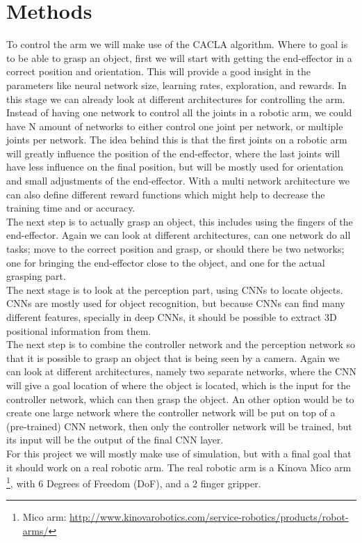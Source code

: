 \section{Methods}
To control the arm we will make use of the CACLA algorithm. Where to goal is to be able to grasp an object, first we will start with getting the end-effector in a correct position and orientation. This will provide a 
good insight in the parameters like neural network size, learning rates, exploration, and rewards. In this stage we can already look at different architectures for controlling the arm. Instead of having one network to
control all the joints in a robotic arm, we could have N amount of networks to either control one joint per network, or multiple joints per network. The idea behind this is that the first joints on a robotic arm will 
greatly influence the position of the end-effector, where the last joints will have less influence on the final position, but will be mostly used for orientation and small adjustments of the end-effector. With a multi network
architecture we can also define different reward functions which might help to decrease the training time and or accuracy. \\
The next step is to actually grasp an object, this includes using the fingers of the end-effector. Again we can look at different architectures, can one network do all tasks; move to the correct position and grasp, or should
there be two networks; one for bringing the end-effector close to the object, and one for the actual grasping part. \\
The next stage is to look at the perception part, using CNNs to locate objects. CNNs are mostly used for object recognition, but because CNNs can find many different features, specially in deep CNNs, it should be possible to 
extract 3D positional information from them. \\
The next step is to combine the controller network and the perception network so that it is possible to grasp an object that is being seen by a camera. Again we can look at different architectures, namely two separate
networks, where the CNN will give a goal location of where the object is located, which is the input for the controller network, which can then grasp the object. An other option would be to create one large network where the 
controller network will be put on top of a (pre-trained) CNN network, then only the controller network will be trained, but its input will be the output of the final CNN layer. \\
For this project we will mostly make use of simulation, but with a final goal that it should work on a real robotic arm. The real robotic arm is a Kinova Mico arm \footnote{Mico arm: \url{http://www.kinovarobotics.com/service-robotics/products/robot-arms/}}, with 6 Degrees of Freedom (DoF), and a 2 finger gripper. 
